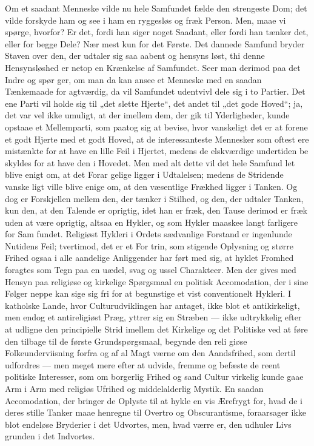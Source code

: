 \documentclass[12pt]{book}
\newcommand{\opage}[1]{\marginnote{\footnotesize\textit{[#1]}}}
\begin{document}
Om et saadant Menneske vilde nu hele Samfundet
fælde den strengeste Dom; det vilde forskyde ham og
see i ham en ryggesløs og fræk Person. Men, maae vi
spørge, hvorfor? Er det, fordi han siger noget Saadant,
eller fordi han tænker det, eller for begge Dele? Nær\-%
mest kun for det Første. Det dannede Samfund bryder
Staven over den, der udtaler sig saa aabent og hensyns\-%
løst, thi denne Hensynsløshed er netop en Krænkelse af
Samfundet. Seer man derimod paa det Indre og spør\-%
ger, om man da kan ansee et Menneske med en saadan
Tænkemaade for agtværdig, da vil Samfundet udentvivl
dele sig i to Partier. Det ene Parti vil holde sig til
„det slette Hjerte“, det andet til „det gode Hoved“; ja,
det var vel ikke umuligt, at der imellem dem, der gik
til Yderligheder, kunde opstaae et Mellemparti, som
paatog sig at bevise, hvor vanskeligt det er at forene
et godt Hjerte med et godt Hoved, at de interessanteste
Mennesker som oftest ere mistænkte for at have en lille
\opage{107}\setcounter{footnote}{0}%
Feil i Hjertet, medens de elskværdige undertiden be\-%
skyldes for at have den i Hovedet. Men med alt dette
vil det hele Samfund let blive enigt om, at det Forar\-%
gelige ligger i Udtalelsen; medens de Stridende vanske\-%
ligt ville blive enige om, at den væsentlige Frækhed
ligger i Tanken. Og dog er Forskjellen mellem den,
der tænker i Stilhed, og den, der udtaler Tanken, kun
den, at den Talende er oprigtig, idet han er fræk, den
Tause derimod er fræk uden at være oprigtig, altsaa en
Hykler, og som Hykler maaskee langt farligere for Sam\-%
fundet. Religiøst Hykleri i Ordets sædvanlige Forstand
er ingenlunde Nutidens Feil; tvertimod, det er et For\-%
trin, som stigende Oplysning og større Frihed ogsaa i
alle aandelige Anliggender har ført med sig, at hyklet
Fromhed foragtes som Tegn paa en uædel, svag og ussel
Charakteer. Men der gives med Hensyn paa religiøse
og kirkelige Spørgsmaal en politisk Accomodation, der
i sine Følger neppe kan sige sig fri for at begunstige et
vist conventionelt Hykleri. I katholske Lande, hvor
Culturudviklingen har antaget, ikke blot et antikirkeligt,
men endog et antireligiøst Præg, yttrer sig en Stræben ---
ikke udtrykkelig efter at udligne den principielle Strid
imellem det Kirkelige og det Politiske ved at føre den
tilbage til de første Grundspørgsmaal, begynde den reli\-%
giøse Folkeunderviisning forfra og af al Magt værne om
den Aandsfrihed, som dertil udfordres --- men meget mere
efter at udvide, fremme og befæste de reent politiske
Interesser, som om borgerlig Frihed og sand Cultur
virkelig kunde gaae Arm i Arm med religiøs Ufrihed
og middelalderlig Mystik. En saadan Accomodation, der
bringer de Oplyste til at hykle en vis Ærefrygt for, hvad
de i deres stille Tanker maae henregne til Overtro og
Obscurantisme, foraarsager ikke blot endeløse Bryderier
\opage{108}\setcounter{footnote}{0}%
i det Udvortes, men, hvad værre er, den udhuler Livs\-%
grunden i det Indvortes.
\end{document}
